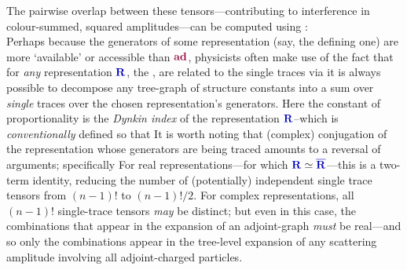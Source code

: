 \documentclass[12pt,a4paper]{article}\let\ifpdf\relax
\begin{document}
The pairwise overlap between these tensors---contributing to interference in colour-summed, squared amplitudes---can be computed using :
%
~\\[-12pt]



Perhaps because the generators of some representation (say, the defining one) are more `available' or accessible than $\mathbf{\r{ad}}$, physicists often make use of the fact that for \emph{any} representation $\mathbf{\b{R}}$, the ,
%
%
are related to the single traces via
%
%
it is always possible to decompose any tree-graph of structure constants into a sum over \emph{single} traces over the chosen representation's generators. Here the constant of proportionality is the \emph{Dynkin index} of the representation $\mathbf{\b{R}}$--which is \emph{conventionally} defined so that 
%
%
It is worth noting that (complex) conjugation of the representation whose generators are being traced amounts to a reversal of arguments; specifically
%
%
For real representations---for which $\mathbf{\b{R}}\simeq\mathbf{\b{\bar{R}}}$---this is a two-term identity, reducing the number of (potentially) independent single trace tensors from $(n{-}1)!$ to $(n{-}1)!/2$. For complex representations, all $(n{-}1)!$ single-trace tensors \emph{may} be distinct; but even in this case, the combinations that appear in the expansion of an adjoint-graph \emph{must} be real---and so only the combinations 
%
%
appear in the tree-level expansion of any scattering amplitude involving all adjoint-charged particles.\\[-10pt]
\end{document}
